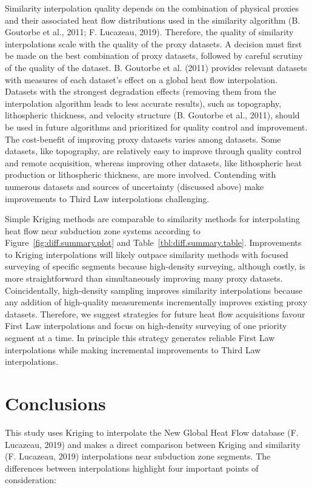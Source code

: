 \documentclass[draft,linenumbers]{agujournal2018}
\begin{document}
Similarity interpolation quality depends on the combination of physical
proxies and their associated heat flow distributions used in the
similarity algorithm (B. Goutorbe et al., 2011; F. Lucazeau, 2019).
Therefore, the quality of similarity interpolations scale with the
quality of the proxy datasets. A decision must first be made on the best
combination of proxy datasets, followed by careful scrutiny of the
quality of the dataset. B. Goutorbe et al. (2011) provides relevant
datasets with measures of each dataset's effect on a global heat flow
interpolation. Datasets with the strongest degradation effects (removing
them from the interpolation algorithm leads to less accurate results),
such as topography, lithospheric thickness, and velocity structure (B.
Goutorbe et al., 2011), should be used in future algorithms and
prioritized for quality control and improvement. The cost-benefit of
improving proxy datasets varies among datasets. Some datasets, like
topography, are relatively easy to improve through quality control and
remote acquisition, whereas improving other datasets, like lithospheric
heat production or lithospheric thickness, are more involved. Contending
with numerous datasets and sources of uncertainty (discussed above) make
improvements to Third Law interpolations challenging.

Simple Kriging methods are comparable to similarity methods for
interpolating heat flow near subduction zone systems according to
Figure~\ref{fig:diff.summary.plot} and
Table~\ref{tbl:diff.summary.table}. Improvements to Kriging
interpolations will likely outpace similarity methods with focused
surveying of specific segments because high-density surveying, although
costly, is more straightforward than simultaneously improving many proxy
datasets. Coincidentally, high-density sampling improves similarity
interpolations because any addition of high-quality measurements
incrementally improves existing proxy datasets. Therefore, we suggest
strategies for future heat flow acquisitions favour First Law
interpolations and focus on high-density surveying of one priority
segment at a time. In principle this strategy generates reliable First
Law interpolations while making incremental improvements to Third Law
interpolations.

\section{Conclusions}

This study uses Kriging to interpolate the New Global Heat Flow database
(F. Lucazeau, 2019) and makes a direct comparison between Kriging and
similarity (F. Lucazeau, 2019) interpolations near subduction zone
segments. The differences between interpolations highlight four
important points of consideration:
\end{document}
